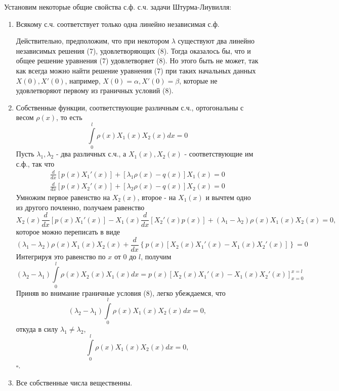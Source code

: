 Установим некоторые общие свойства с.ф. с.ч. задачи Штурма-Лиувилля:
\begin{enumerate}
	\item{Всякому с.ч. соответствует только одна линейно независимая с.ф.

			Действительно, предположим, что при некотором $\lambda$ существуют два линейно независимых решения (7), удовлетворяющих (8). Тогда оказалось бы, что и общее решение уравнения (7) удовлетворяет (8). Но этого быть не может, так как всегда можно найти решение уравнения (7) при таких начальных данных $X(0), X'(0)$, например, $X(0)=\alpha, X'(0)=\beta$, которые не удовлетворяют первому из граничных условий (8).
		}
		\item{Собственные функции, соответствующие различным с.ч., ортогональны с весом $\rho(x)$, то есть
				\[
					\int\limits_0^l \rho(x) X_1 (x) X_2 (x) dx = 0 \tag{10}
				\]
			Пусть $\lambda_1, \lambda_2$ - два различных с.ч., а $X_1(x), X_2(x)$ - соответствующие им с.ф., так что
			\[
				\begin{aligned}
					\frac{d}{dx} \left[ p(x) X_1'(x)\right] + \left[ \lambda_1 \rho(x) - q(x)\right]X_1(x) = 0 \\
					\frac{d}{dx} \left[ p(x) X_2'(x)\right] + \left[ \lambda_2 \rho(x) - q(x)\right]X_2 (x) = 0
				\end{aligned}
			\]
			Умножим первое равенство на $X_2(x)$, второе - на $X_1(x)$ и вычтем одно из другого почленно, получаем равенство
			\[
				X_2(x) \frac{d}{dx} \left[ p(x) X_1'(x)\right] - X_1 (x) \frac{d}{dx} \left[ X_2'(x) p(x)\right] + (\lambda_1 - \lambda_2) \rho(x) X_1 (x) X_2 (x) = 0,
			\]
			которое можно переписать в виде
			\[
				(\lambda_1 - \lambda_2) \rho(x) X_1 (x) X_2 (x) + \frac{d}{dx} \left\{ p(x) \left[ X_2(x) X_1'(x) - X_1 (x) X_2' (x)\right]\right\} = 0
			\]
			Интегрируя это равенство по $x$ от $0$ до $l$, получим
			\[
				(\lambda_2 - \lambda_1) \int\limits_0^l \rho(x) X_2 (x) X_1 (x) dx = p(x) \left[ X_2 (x) X_1' (x) - X_1 (x) X_2' (x)\right]_{x=0}^{x=l}
			\]
			Приняв во внимание граничные условия (8), легко убеждаемся, что
			\[
				(\lambda_2 - \lambda_1) \int\limits_0^l \rho(x) X_1 (x) X_2 (x) dx = 0,
			\]
			откуда в силу $\lambda_1 \ne \lambda_2$,
			\[
				\int\limits_0^l \rho(x) X_1 (x) X_2 (x) dx = 0,
			\]
			$\square$.
			}
			\item{Все собственные числа вещественны.

}
\end{enumerate}
